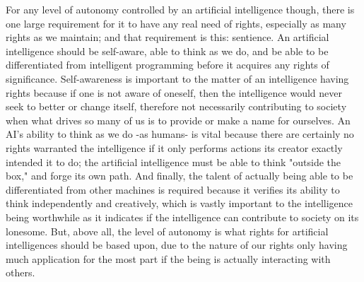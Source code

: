 For any level of autonomy controlled by an artificial intelligence though, there is one large requirement for it to have any real need of rights, especially as many rights as we maintain; and that requirement is this: sentience. An artificial intelligence should be self-aware, able to think as we do, and be able to be differentiated from intelligent programming before it acquires any rights of significance. Self-awareness is important to the matter of an intelligence having rights because if one is not aware of oneself, then the intelligence would never seek to better or change itself, therefore not necessarily contributing to society when what drives so many of us is to provide or make a name for ourselves. An AI's ability to think as we do -as humans- is vital because there are certainly no rights warranted the intelligence if it only performs actions its creator exactly intended it to do; the artificial intelligence must be able to think "outside the box," and forge its own path. And finally, the talent of actually being able to be differentiated from other machines is required because it verifies its ability to think independently and creatively, which is vastly important to the intelligence being worthwhile as it indicates if the intelligence can contribute to society on its lonesome. But, above all, the level of autonomy is what rights for artificial intelligences should be based upon, due to the nature of our rights only having much application for the most part if the being is actually interacting with others.